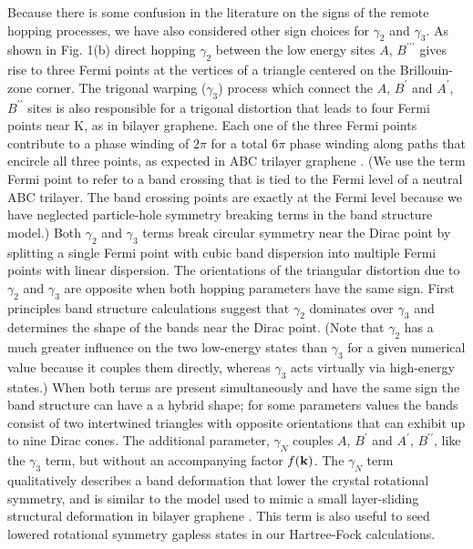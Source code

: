 \documentclass[twocolumn,prb,showpacs,preprintnumbers,amsmath,amssymb]{revtex4}
\begin{document}
Because there is some confusion in the literature on the signs of the remote hopping processes,
we have also considered other sign choices for $\gamma_2$ and $\gamma_3$.  
As shown in Fig. 1(b) direct hopping $\gamma_2$ between the low energy sites $A$, $B^{\prime \prime \prime}$
gives rise to three Fermi points at the vertices of a triangle centered on the 
Brillouin-zone corner.
The trigonal warping ($\gamma_3$) process which connect the $A$, $B^{\prime}$ and 
$A^{\prime} $, $B^{\prime \prime}$ sites is also responsible for a trigonal distortion 
that leads to four Fermi points near K, as in bilayer graphene.
Each one of the three Fermi points contribute to a phase winding of $2 \pi$
for a total $6 \pi$ phase winding along paths that encircle all three points,
as expected in ABC trilayer graphene \cite{hongki1}.
(We use the term Fermi point to refer to a band crossing that is tied to the Fermi 
level of a neutral ABC trilayer.  The band crossing points are exactly at the 
Fermi level because we have neglected particle-hole symmetry breaking terms 
in the band structure model.)  
Both $\gamma_2$ and $\gamma_3$ terms break circular symmetry near the Dirac point by splitting a 
single Fermi point with cubic band dispersion into multiple Fermi points with linear dispersion. 
The orientations of the triangular distortion due to $\gamma_2$ and  $\gamma_3$
are opposite when both hopping parameters have the same sign.
First principles band structure calculations suggest that $\gamma_2$ dominates 
over $\gamma_3$ and determines the shape of the bands near the Dirac point.
(Note that $\gamma_2$ has a much greater influence on the two low-energy states than 
$\gamma_3$ for a given numerical value because it couples them directly, whereas 
$\gamma_3$ acts virtually via high-energy states.)   
When both terms are present simultaneously and have the same sign
the band structure can have a a hybrid shape; 
for some parameters values the bands consist of two 
intertwined triangles with opposite orientations that can exhibit up to nine Dirac cones.
The additional parameter, $\gamma_N$ couples $A$, $B^{\prime}$ and $A^{\prime}$, 
$B^{\prime \prime}$, like the $\gamma_3$ term, but without an accompanying factor $f({\bf k})$.
The $\gamma_N$ term qualitatively describes a  band deformation that lower the crystal rotational symmetry,
and is similar to the model used to mimic a small layer-sliding structural deformation in bilayer graphene \cite{kruczynski}.
This term is also useful to seed lowered rotational symmetry 
gapless states in our Hartree-Fock calculations.
\end{document}
